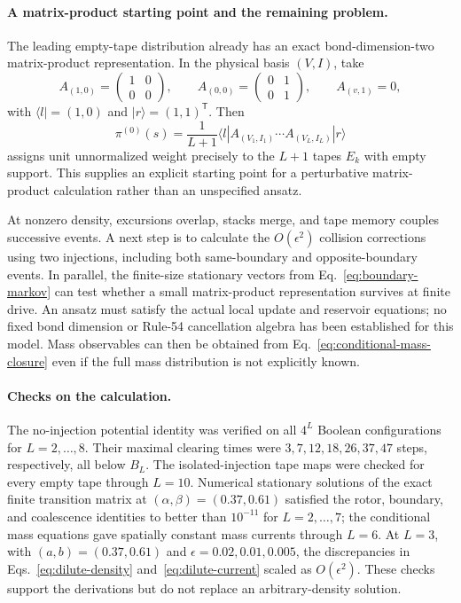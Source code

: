\documentclass{article}
\begin{document}
\paragraph{A matrix-product starting point and the remaining problem.}
The leading empty-tape distribution already has an exact bond-dimension-two
matrix-product representation.  In the physical basis $(V,I)$, take
\begin{equation}
A_{(1,0)}=\begin{pmatrix}1&0\\0&0\end{pmatrix},\qquad
A_{(0,0)}=\begin{pmatrix}0&1\\0&1\end{pmatrix},\qquad
A_{(v,1)}=0,
\end{equation}
with $\langle l|=(1,0)$ and $|r\rangle=(1,1)^{\mathsf T}$.  Then
\begin{equation}
\pi^{(0)}(s)=\frac{1}{L+1}
 \langle l|A_{(V_1,I_1)}\cdots A_{(V_L,I_L)}|r\rangle
\end{equation}
assigns unit unnormalized weight precisely to the $L+1$ tapes $E_k$ with
empty support.  This supplies an explicit starting point for a perturbative
matrix-product calculation rather than an unspecified ansatz.

At nonzero density, excursions overlap, stacks merge, and tape memory
couples successive events.  A next step is to calculate the
$O(\epsilon^2)$ collision corrections using two injections, including both
same-boundary and opposite-boundary events.  In parallel, the finite-size
stationary vectors from Eq.~\eqref{eq:boundary-markov} can test whether a
small matrix-product representation survives at finite drive.  An ansatz
must satisfy the actual local update and reservoir equations; no fixed
bond dimension or Rule-54 cancellation algebra has been established for
this model.  Mass observables can then be obtained from
Eq.~\eqref{eq:conditional-mass-closure} even if the full mass distribution
is not explicitly known.

\paragraph{Checks on the calculation.}
The no-injection potential identity was verified on all $4^L$ Boolean
configurations for $L=2,\ldots,8$.  Their maximal clearing times were
$3,7,12,18,26,37,47$ steps, respectively, all below $B_L$.
The isolated-injection tape maps were checked for every empty tape through
$L=10$.  Numerical stationary solutions of the exact finite transition
matrix at $(\alpha,\beta)=(0.37,0.61)$ satisfied the rotor, boundary, and
coalescence identities to better than $10^{-11}$ for $L=2,\ldots,7$;
the conditional mass equations gave spatially constant mass currents
through $L=6$.  At $L=3$, with $(a,b)=(0.37,0.61)$ and
$\epsilon=0.02,0.01,0.005$, the discrepancies in
Eqs.~\eqref{eq:dilute-density} and~\eqref{eq:dilute-current} scaled as
$O(\epsilon^2)$.  These checks support the derivations but do not replace
an arbitrary-density solution.
\end{document}
